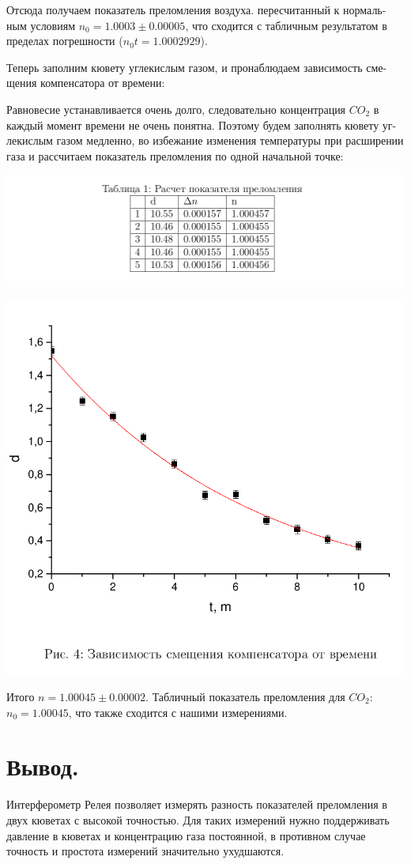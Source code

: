 \documentclass[a4paper,12pt]{article} %
\begin{document}
Отсюда получаем показатель преломления воздуха. пересчитанный к нормаль-
ным условиям $n_0 = 1.0003 \pm 0.00005$, что сходится с табличным результатом в 
пределах погрешности ($n_0t = 1.0002929$).

Теперь заполним кювету углекислым газом, и пронаблюдаем зависимость сме-
щения компенсатора от времени:

Равновесие устанавливается очень долго, следовательно концентрация $CO_2$ в
каждый момент времени не очень понятна. Поэтому будем заполнять кювету уг-
лекислым газом медленно, во избежание изменения температуры при расширении
газа и рассчитаем показатель преломления по одной начальной точке:

\begin{center}
    \includegraphics[scale=0.6]{tab1}
\end{center}

\begin{center}
    \includegraphics[scale=0.8]{pic4}
\end{center}

Итого $n = 1.00045 \pm 0.00002$. Табличный показатель преломления для $CO_2$: $n_0 = 1.00045$, что также сходится с нашими измерениями.

\section{Вывод.}

Интерферометр Релея позволяет измерять разность показателей преломления
в двух кюветах с высокой точностью. Для таких измерений нужно поддерживать
давление в кюветах и концентрацию газа постоянной, в противном случае точность
и простота измерений значительно ухудшаются.
\end{document}
